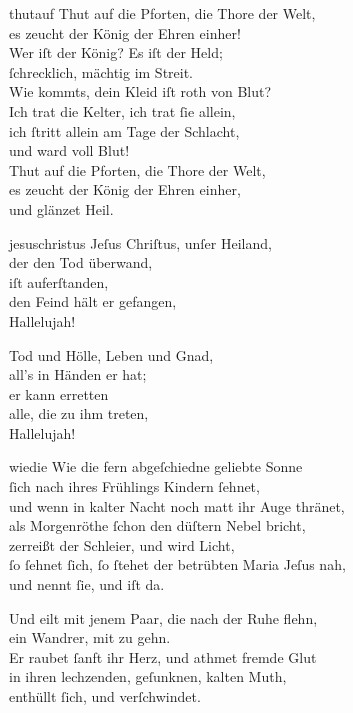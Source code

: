 \documentclass[tocstyle=ref-genre]{ees}
\begin{document}
{\begin{movement}{thutauf}
  \voice[Coro]
  Thut auf die Pforten, die Thore der Welt,\\
  es zeucht der König der Ehren einher!\\
  Wer iſt der König? Es iſt der Held;\\
  ſchrecklich, mächtig im Streit.\\
  Wie kommts, dein Kleid iſt roth von Blut?\\
  Ich trat die Kelter, ich trat ſie allein,\\
  ich ſtritt allein am Tage der Schlacht,\\
  und ward voll Blut!\\
  Thut auf die Pforten, die Thore der Welt,\\
  es zeucht der König der Ehren einher,\\
  und glänzet Heil.
\end{movement}

\begin{movement}{jesuschristus}
  \voice[Coro]
  Jeſus Chriſtus, unſer Heiland,\\
  der den Tod überwand,\\
  iſt auferſtanden,\\
  den Feind hält er gefangen,\\
  Hallelujah!

  Tod und Hölle, Leben und Gnad,\\
  all’s in Händen er hat;\\
  er kann erretten\\
  alle, die zu ihm treten,\\
  Hallelujah!
\end{movement}

\begin{movement}{wiedie}
  \voice[Tenore I]
  Wie die fern abgeſchiedne geliebte Sonne\\
  ſich nach ihres Frühlings Kindern ſehnet,\\
  und wenn in kalter Nacht noch matt ihr Auge thränet,\\
  als Morgenröthe ſchon den düſtern Nebel bricht,\\
  zerreißt der Schleier, und wird Licht,\\
  ſo ſehnet ſich, ſo ſtehet der betrübten Maria Jeſus nah,\\
  und nennt ſie, und iſt da.

  \voice[Tenore II]
  Und eilt mit jenem Paar, die nach der Ruhe flehn,\\
  ein Wandrer, mit zu gehn.\\
  Er raubet ſanft ihr Herz, und athmet fremde Glut\\
  in ihren lechzenden, geſunknen, kalten Muth,\\
  enthüllt ſich, und verſchwindet.


\end{movement}}
\end{document}
